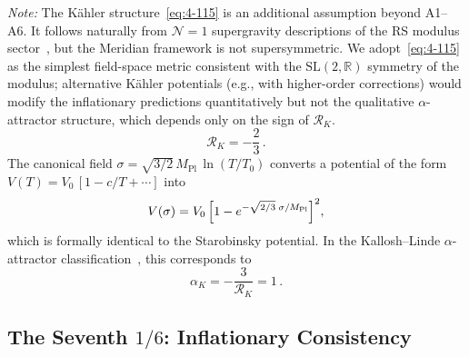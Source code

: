 \emph{Note:} The K\"ahler structure~\eqref{eq:4-115} is an additional assumption beyond A1--A6. It follows naturally from $\mathcal{N} = 1$ supergravity descriptions of the RS modulus sector~\cite{ch4:Luty1999}, but the Meridian framework is not supersymmetric. We adopt~\eqref{eq:4-115} as the simplest field-space metric consistent with the $\mathrm{SL}(2,\mathbb{R})$ symmetry of the modulus; alternative K\"ahler potentials (e.g., with higher-order corrections) would modify the inflationary predictions quantitatively but not the qualitative $\alpha$-attractor structure, which depends only on the sign of $\mathcal{R}_K$.
\begin{equation}
  \mathcal{R}_K = -\frac{2}{3}\,.
  \label{eq:4-116}
\end{equation}
The canonical field $\sigma = \sqrt{3/2}\, M_{\mathrm{Pl}}\, \ln(T/T_0)$ converts a potential of the form $V(T) = V_0\, [1 - c/T + \cdots]$ into
\begin{equation}
  V(\sigma) = V_0\, \Bigl[1 - e^{-\sqrt{2/3}\;\sigma/M_{\mathrm{Pl}}}\Bigr]^2,
  \label{eq:4-117}
\end{equation}
which is formally identical to the Starobinsky potential. In the Kallosh--Linde $\alpha$-attractor classification~\cite{ch4:KalloshLinde2013}, this corresponds to
\begin{equation}
  \alpha_K = -\frac{3}{\mathcal{R}_K} = 1\,.
  \label{eq:4-118}
\end{equation}

\subsection{The Seventh $1/6$: Inflationary Consistency}
\label{sec:4-seventh-one-sixth}

